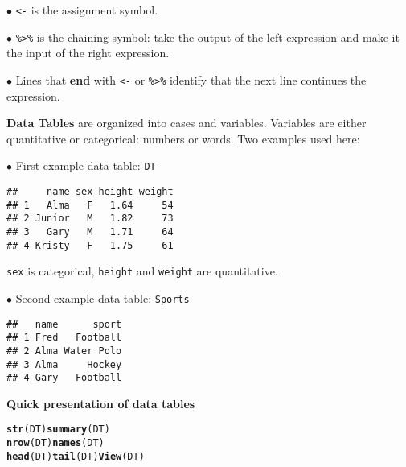 \documentclass{report}\usepackage[]{graphicx}\usepackage[]{color}
\makeatletter
\newcommand{\hlkwd}[1]{\textcolor[rgb]{0.737,0.353,0.396}{\textbf{#1}}}%
\newenvironment{kframe}{%
 \def\at@end@of@kframe{}%
 \ifinner\ifhmode%
  \def\at@end@of@kframe{\end{minipage}}%
  \begin{minipage}{\columnwidth}%
 \fi\fi%
 \def\FrameCommand##1{\hskip\@totalleftmargin \hskip-\fboxsep
 \colorbox{shadecolor}{##1}\hskip-\fboxsep
     \hskip-\linewidth \hskip-\@totalleftmargin \hskip\columnwidth}%
 \MakeFramed {\advance\hsize-\width
   \@totalleftmargin\z@ \linewidth\hsize
   \@setminipage}}%
 {\par\unskip\endMakeFramed%
 \at@end@of@kframe}
\newenvironment{knitrout}{}{} %
\newcommand{\asection}[1]{{\sf\bfseries #1}}
\renewenvironment{knitrout}{\vspace*{-.1in}}{\vspace*{-.1in}} %
\makeatother
\begin{document}
\begin{multicols}{4}
$\bullet$ \texttt{<-} is the assignment symbol.
\smallskip

$\bullet$ \texttt{\%>\%} is the chaining symbol: take the output of the left expression and make it the input of the right expression.

\smallskip

$\bullet$ Lines that {\bf end} with \texttt{<-} or \texttt{\%>\%} identify that the next line continues the expression. 

\medskip

\asection{Data Tables} are organized into cases and variables.  Variables are either quantitative or categorical: numbers or words. Two examples used here:


\smallskip

\begin{small}
$\bullet$ First example data table: \texttt{DT}
\begin{knitrout}
\color{fgcolor}\begin{kframe}
\begin{verbatim}
##     name sex height weight
## 1   Alma   F   1.64     54
## 2 Junior   M   1.82     73
## 3   Gary   M   1.71     64
## 4 Kristy   F   1.75     61
\end{verbatim}
\end{kframe}
\end{knitrout}
\texttt{sex} is categorical, \texttt{height} and \texttt{weight} are quantitative.

\smallskip

$\bullet$ Second example data table: \texttt{Sports}

\begin{knitrout}
\color{fgcolor}\begin{kframe}
\begin{verbatim}
##   name      sport
## 1 Fred   Football
## 2 Alma Water Polo
## 3 Alma     Hockey
## 4 Gary   Football
\end{verbatim}
\end{kframe}
\end{knitrout}
\end{small}


\smallskip

\asection{Quick presentation of data tables}

\begin{knitrout}
\color{fgcolor}\begin{kframe}
\begin{alltt}
\hlkwd{str}(DT)  \hlkwd{summary}(DT)  
\hlkwd{nrow}(DT) \hlkwd{names}(DT)
\hlkwd{head}(DT) \hlkwd{tail}(DT) \hlkwd{View}(DT)
\end{alltt}
\end{kframe}
\end{knitrout}


\end{multicols}
\end{document}
